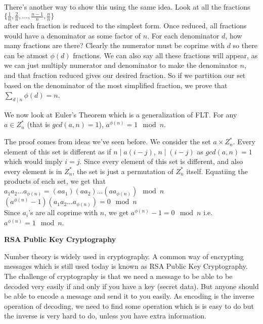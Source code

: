\documentclass[a4paper,10pt]{article}
\theoremstyle{definition} %
\begin{document}
    There's another way to show this using the same idea. Look at all the fractions \\
    $ \{\frac{1}{n}, \frac{2}{n}, \dots, \frac{n-1}{n}, \frac{n}{n} \} $ \\ 
    after each fraction is reduced to the simplest form. Once reduced, all fractions would
    have a denominator as some factor of $n$. For each denominator $d$, how many fractions are
    there? Clearly the numerator must be coprime with $d$ so there can be atmost $\phi(d)$
    fractions. We can also say all these fractions will appear, as we can just multiply 
    numerator and denominator to make the denominator $n$, and that fraction reduced
    gives our desired fraction. So if we partition our set based
    on the denominator of the most simplified fraction, we prove that $\sum_{d \mid n} \phi(d) = n$.

    We now look at Euler's Theorem which is a generalization of FLT. For any $a \in Z_n^*$
    (that is $gcd(a,n)=1$), $a^{\phi(n)} = 1 \mod n$.

    The proof comes from ideas we've seen before. We consider the set $a \times Z_n^*$.
    Every element of this set is different as if $n \mid a(i-j)$, $n \mid (i-j)$ as $gcd(a,n)=1$
    which would imply $i=j$. Since every element of this set is different, and also every 
    element is in $Z_n^*$, the set is just a permutation of $Z_n^*$ itself. Equatiing the 
    products of each set, we get that \\
    $a_1a_2 \dots a_{\phi(n)} = (aa_1)(aa_2)\dots(aa_{\phi(n)}) \mod n$ \\
    $(a^{\phi(n)} - 1)(a_1a_2 \dots a_{\phi(n)}) = 0 \mod n$ \\
    Since $a_i$'s are all coprime with $n$, we get $a^{\phi(n)} - 1 = 0 \mod n$ i.e.
    $a^{\phi(n)} = 1 \mod n$.

    \textbf{RSA Public Key Cryptography}

    Number theory is widely used in cryptography. A common way of encrypting messages which 
    is still used today is known as RSA Public Key Cryptography. The challenge of cryptography
    is that we need a message to be able to be decoded very easily if and only if you have a 
    key (secret data). But anyone should be able to encode a message and send it to you easily.
    As encoding is the inverse operation of decoding, we need to find some operation which is 
    is easy to do but the inverse is very hard to do, unless you have extra information.
\end{document}
